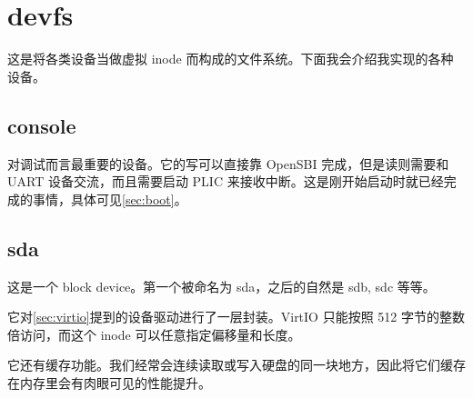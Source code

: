 \section{devfs}
\label{sec:devfs}

这是将各类设备当做虚拟 inode 而构成的文件系统。下面我会介绍我实现的各种设备。

\subsection{console}

对调试而言最重要的设备。它的写可以直接靠 OpenSBI 完成，但是读则需要和 UART 设备交流，而且需要启动 PLIC 来接收中断。这是刚开始启动时就已经完成的事情，具体可见\cref{sec:boot}。

\subsection{sda}

这是一个 block device。第一个被命名为 sda，之后的自然是 sdb, sdc 等等。

它对\cref{sec:virtio}提到的设备驱动进行了一层封装。VirtIO 只能按照 512 字节的整数倍访问，而这个 inode 可以任意指定偏移量和长度。

它还有缓存功能。我们经常会连续读取或写入硬盘的同一块地方，因此将它们缓存在内存里会有肉眼可见的性能提升。
